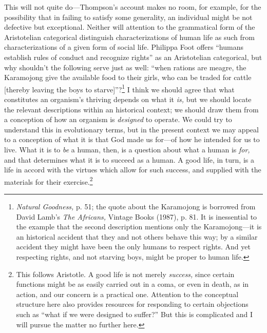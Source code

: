 \documentclass[11pt]{amsart}
\begin{document}
This will not quite do---Thompson's account makes no room, for example, for the possibility that in failing to satisfy some generality, an individual might be not defective but exceptional. Neither will attention to the grammatical form of the Aristotelian categorical distinguish characterizations of human life as such from characterizations of a given form of social life. Philippa Foot offers ``humans establish rules of conduct and recognize rights'' as an Aristotelian categorical, but why shouldn't the following serve just as well: ``when rations are meagre, the Karamojong give the available food to their girls, who can be traded for cattle [thereby leaving the boys to starve]''?\footnote{\emph{Natural Goodness,} p. 51; the quote about the Karamojong is borrowed from David Lamb's \emph{The Africans,} Vintage Books (1987), p. 81. It is inessential to the example that the second description mentions only the Karamojong---it is an historical accident that they and not others behave this way; by a similar accident they might have been the only humans to respect rights. And yet respecting rights, and not starving boys, might be proper to human life.} I think we should agree that what constitutes an organism's thriving depends on what it \emph{is,} but we should locate the relevant descriptions within an historical context; we should draw them from a conception of how an organism is \emph{designed} to operate. We could try to understand this in evolutionary terms, but in the present context we may appeal to a conception of what it is that God made us for---of how he intended for us to live. What it is to \emph{be} a human, then, is a question about what a human is \emph{for,} and that determines what it is to succeed as a human. A good life, in turn, is a life in accord with the virtues which allow for such success, and supplied with the materials for their exercise.\footnote{This follows Aristotle. A good life is not merely \emph{success,} since certain functions might be as easily carried out in a coma, or even in death, as in action, and our concern is a practical one. Attention to the conceptual structure here also provides resources for responding to certain objections such as ``what if we were designed to suffer?'' But this is complicated and I will pursue the matter no further here.}

\end{document}
